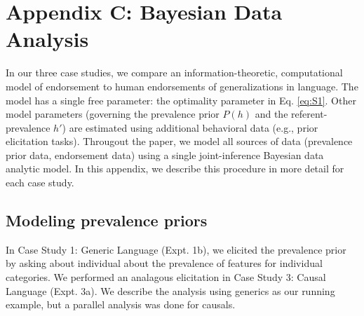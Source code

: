 \documentclass[english,floatsintext,man]{apa6}
\theoremstyle{definition}
\theoremstyle{definition}
\theoremstyle{definition}
\theoremstyle{remark}
\begin{document}
\newpage

\section{Appendix C: Bayesian Data
Analysis}\label{appendix-c-bayesian-data-analysis}

In our three case studies, we compare an information-theoretic,
computational model of endorsement to human endorsements of
generalizations in language. The model has a single free parameter: the
optimality parameter in Eq. \ref{eq:S1}. Other model parameters
(governing the prevalence prior \(P(h)\) and the referent-prevalence
\(h'\)) are estimated using additional behavioral data (e.g., prior
elicitation tasks). Througout the paper, we model all sources of data
(prevalence prior data, endorsement data) using a single joint-inference
Bayesian data analytic model. In this appendix, we describe this
procedure in more detail for each case study.

\subsection{Modeling prevalence
priors}\label{modeling-prevalence-priors}

In Case Study 1: Generic Language (Expt. 1b), we elicited the prevalence
prior by asking about individual about the prevalence of features for
individual categories. We performed an analagous elicitation in Case
Study 3: Causal Language (Expt. 3a). We describe the analysis using
generics as our running example, but a parallel analysis was done for
causals.
\end{document}
